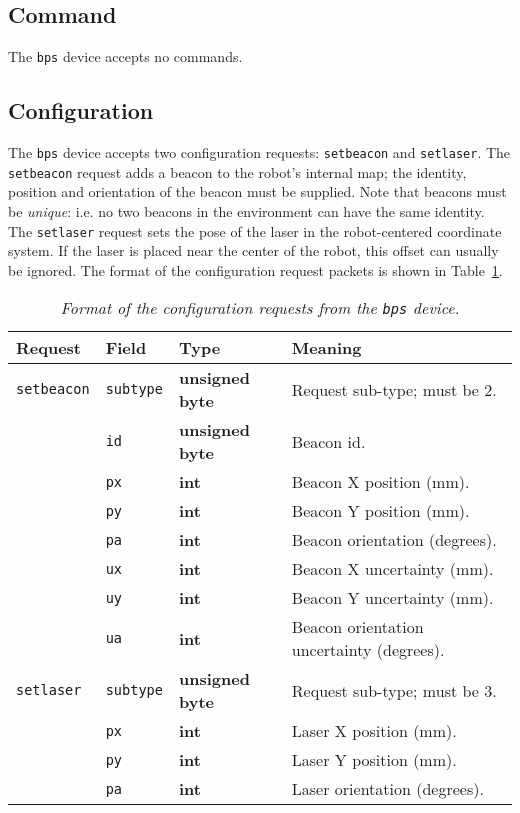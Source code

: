 \subsection*{Command}
The {\tt bps} device accepts no commands.

\subsection*{Configuration}

The {\tt bps} device accepts two configuration requests: 
{\tt setbeacon} and {\tt setlaser}.
The {\tt setbeacon} request adds a beacon to the robot's internal map;
the identity, position and orientation of the beacon must be supplied.
Note that beacons must be {\em unique}: i.e. no two beacons in the
environment can have the same identity.
The {\tt setlaser} request sets the pose of the laser in the
robot-centered coordinate system.  If the laser is placed near the
center of the robot, this offset can usually be ignored.
The format of the configuration request packets is shown in
Table~\ref{table:bps_config}.

\begin{table}[ht]
\begin{center}
\begin{tabularx}{\columnwidth}{|l|l|l|X|}
\hline
Request & Field & Type & Meaning \\
\hline
{\tt setbeacon} & {\tt subtype} & {\bf unsigned byte} & Request sub-type; must be 2. \\
                & {\tt id} & {\bf unsigned byte} & Beacon id. \\
                & {\tt px} & {\bf int} & Beacon X position (mm). \\
                & {\tt py} & {\bf int} & Beacon Y position (mm). \\
                & {\tt pa} & {\bf int} & Beacon orientation (degrees). \\
                & {\tt ux} & {\bf int} & Beacon X uncertainty (mm). \\
                & {\tt uy} & {\bf int} & Beacon Y uncertainty (mm). \\
                & {\tt ua} & {\bf int} & Beacon orientation uncertainty (degrees). \\
\hline
{\tt setlaser} & {\tt subtype} & {\bf unsigned byte} & Request sub-type; must be 3. \\
               & {\tt px} & {\bf int} & Laser X position (mm). \\
               & {\tt py} & {\bf int} & Laser Y position (mm). \\
               & {\tt pa} & {\bf int} & Laser orientation (degrees). \\
\hline
\end{tabularx}
\end{center}
\caption{{\em Format of the configuration requests from the {\tt bps} device.}}
\label{table:bps_config}
\end{table}
